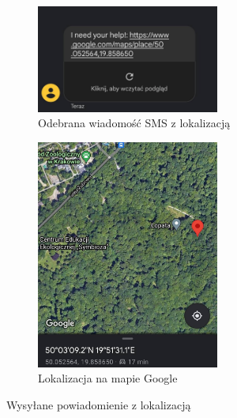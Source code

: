 \begin{figure}
    \centering
    \begin{subfigure}[b]{6cm}
    \includegraphics[width=6cm]{Graphics/sms.jpg}
    \caption{Odebrana wiadomość SMS z lokalizacją}
    \label{img:sms}
    \end{subfigure}%
    \vspace{1cm}
    \begin{subfigure}[b]{6cm}
    \includegraphics[width=6cm]{Graphics/maps.jpg}
    \caption{Lokalizacja na mapie Google}
    \label{img:maps}
    \end{subfigure}
    \caption{Wysyłane powiadomienie z lokalizacją}
    \label{img:notification}
\end{figure}
